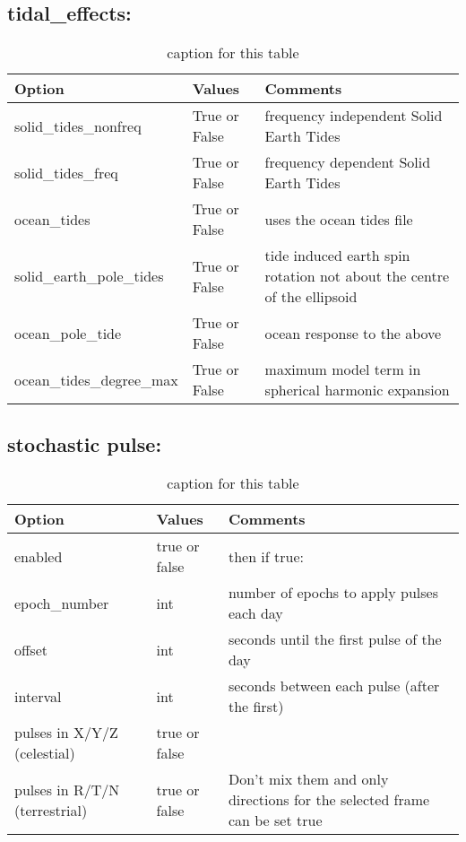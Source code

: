 \subsection{tidal\_effects:}
\begin{table}[h!]
	\begin{tabular}{|p{2.5cm}|p{2.5cm}|p{5cm}|}
	\hline
	Option & Values & Comments \\
	\hline
	solid\_tides\_nonfreq & True or False & frequency independent Solid Earth Tides \\
	solid\_tides\_freq & True or False & frequency dependent Solid Earth Tides \\
	ocean\_tides & True or False & uses the ocean tides file \\
	solid\_earth\_pole\_tides & True or False & tide induced earth spin rotation not about the centre of the ellipsoid \\
	ocean\_pole\_tide & True or False & ocean response to the above \\
	ocean\_tides\_degree\_max & True or False & maximum model term in spherical harmonic expansion \\
	\hline
\end{tabular}
\caption{caption for this table}
\label{table:label_name}
\end{table}
%
\subsection{stochastic pulse:}
\begin{table}[h!]
	\begin{tabular}{|p{2.5cm}|p{2.5cm}|p{5cm}|}
		\hline
		Option & Values & Comments \\
		\hline
		enabled & true or false & then if true: \\
		\hline
		epoch\_number & int & number of epochs to apply pulses each day \\
		offset & int & seconds until the first pulse of the day \\
		interval & int & seconds between each pulse (after the first)\\
		\hline
		pulses in X/Y/Z (celestial) & true or false & \\
		pulses in R/T/N (terrestrial) & true or false & Don't mix them and only directions for the selected frame can be set true\\
		\hline
	\end{tabular}
	\caption{caption for this table}
	\label{table:label_name}
\end{table}

